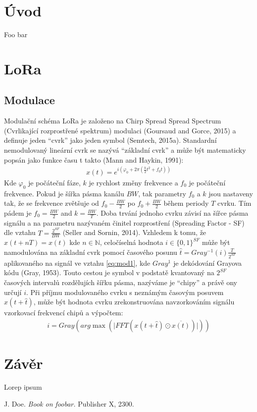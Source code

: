 \documentclass{ctuthesis}
\begin{document}
\maketitle

\chapter{Úvod}

Foo bar

\chapter{LoRa}
\section{Modulace}
Modulační schéma LoRa je založeno na Chirp Spread Spread Spectrum (Cvrlikající rozprostřené spektrum) modulaci  (Goursaud and Gorce, 2015) a definuje jeden “cvrk” jako jeden symbol  (Semtech, 2015a). Standardní nemodulovaný lineární cvrk se nazývá “základní cvrk” a může být matematicky popsán jako funkce času t takto (Mann and Haykin, 1991):
\begin{align}x(t)=e^{i(\varphi_{0}+2\pi(\frac{k}{2}t^{2} + f_{0}t))}
\label{eq:mod1}
\end{align}
Kde  $\varphi_{0}$ je počáteční fáze, $k$ je rychlost změny frekvence a $f_{0}$ je počáteční frekvence. Pokud je šířka pásma kanálu $BW$, tak parametry $f_{0}$ a $k$ jsou nastaveny tak, že se frekvence zvětšuje od $f_{0}-\frac{BW}{2}$ po $f_{0}+\frac{BW}{2}$ během periody $T$ cvrku. Tím pádem je $f_{0}=\frac{BW}{2}$ and $k = \frac{BW}{T}$. Doba trvání jednoho cvrku závisí na šířce pásma signálu a na parametru nazývaném činitel rozprostření (Spreading Factor - SF) dle vztahu $T = \frac{2^{SF}}{BW}$ (Seller and Sornin, 2014).
Vzhledem k tomu, že $x(t + nT) = x(t)$ kde $n\in \mathbb{N}$, celočíselná hodnota $i \in \{0, 1\}^{SF}$ může být namodulována na základní cvrk pomocí časového posunu $\hat{t} = Gray^{-1}(i)\frac{T}{2^{SF}}$ aplikovaného na signál ve vztahu \eqref{eq:mod1},  kde $Gray^{1}$ je dekódování Grayova kódu (Gray, 1953). Touto cestou je symbol v podstatě kvantovaný na $2^{SF}$ časových intervalů rozdělujích šířku pásma, nazýváme je “chipy” a právě ony určují $i$. Při příjmu modulovaného cvrku s neznámým časovým posuvem $x(t + \hat{t})$, může být hodnota cvrku zrekonstruována navzorkováním signálu vzorkovací frekvencí chipů a výpočtem:
\begin{align}i= Gray(arg \max (\lvert FFT(x(t+ \hat{t}) \odot \overline{x(t)}) \rvert ))
\label{eq:mod2}
\end{align}


\chapter{Závěr}

Lorep ipsum \cite{doe}

\begin{thebibliography}{1}

 J. Doe. \emph{Book on foobar.} Publisher X,
 2300.

\end{thebibliography}
\end{document}
